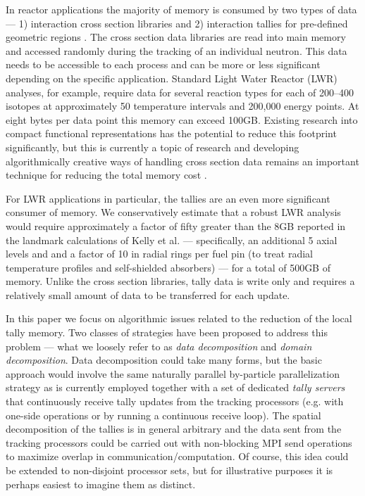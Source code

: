 In reactor applications the majority of memory is consumed by two types of data
--- 1) interaction cross section libraries and 2) interaction tallies for
pre-defined geometric regions \cite{mc-hoogenboom-2009}. The cross section data
libraries are read into main memory and accessed randomly during the tracking of
an individual neutron. This data needs to be accessible to each process and can
be more or less significant depending on the specific application. Standard
Light Water Reactor (LWR) analyses, for example, require data for several
reaction types for each of 200--400 isotopes at approximately 50 temperature
intervals and 200,000 energy points. At eight bytes per data point this memory
can exceed 100GB. Existing research into compact functional representations has
the potential to reduce this footprint significantly, but this is currently a
topic of research and developing algorithmically creative ways of handling cross
section data remains an important technique for reducing the total memory cost
\cite{pnst-brown-2011}.

For LWR applications in particular, the tallies are an even more significant
consumer of memory. We conservatively estimate that a robust LWR analysis would
require approximately a factor of fifty greater than the 8GB reported in the
landmark calculations of Kelly et al. \cite{physor-kelly-2010} --- specifically,
an additional 5 axial levels and and a factor of 10 in radial rings per fuel pin
(to treat radial temperature profiles and self-shielded absorbers) --- for a
total of 500GB of memory. Unlike the cross section libraries, tally data is
write only and requires a relatively small amount of data to be transferred for
each update.

In this paper we focus on algorithmic issues related to the reduction of the
local tally memory. Two classes of strategies have been proposed to address this
problem --- what we loosely refer to as \emph{data decomposition} and
\emph{domain decomposition}. Data decomposition could take many forms, but the
basic approach would involve the same naturally parallel by-particle
parallelization strategy as is currently employed together with a set of
dedicated \emph{tally servers} that continuously receive tally updates from the
tracking processors (e.g. with one-side operations or by running a continuous
receive loop).  The spatial decomposition of the tallies is in general arbitrary
and the data sent from the tracking processors could be carried out with
non-blocking MPI send operations to maximize overlap in
communication/computation. Of course, this idea could be extended to
non-disjoint processor sets, but for illustrative purposes it is perhaps easiest
to imagine them as distinct.

